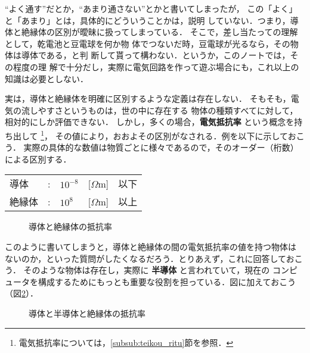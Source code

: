         “よく通す”だとか，“あまり通さない”とかと書いてしまったが，
        この「よく」と「あまり」とは，具体的にどういうことかは，説明
        していない．つまり，導体と絶縁体の区別が曖昧に扱ってしまっている．
        そこで，差し当たっての理解として，乾電池と豆電球を何か物
        体でつないだ時，豆電球が光るなら，その物体は導体である，と判
        断して貰って構わない．というか，このノートでは，その程度の理
        解で十分だし，実際に電気回路を作って遊ぶ場合にも，これ以上の
        知識は必要としない．

        実は，導体と絶縁体を明確に区別するような定義は存在しない．
        そもそも，電気の流しやすさというものは，世の中に存在する
        物体の種類すべてに対して，相対的にしか評価できない．
        しかし，多くの場合，\textbf{電気抵抗率} という概念を持ち出して
            \footnote{
                電気抵抗率については，\ref{subsub:teikou_ritu}節を参照．
            }，
        その値により，おおよその区別がなされる．例を以下に示しておこう．
        実際の具体的な数値は物質ごとに様々であるので，そのオーダー（桁数）
        による区別する．

        \begin{center}
            \begin{tabular}{lllll}
                導体    &:  & ${10}^{-8}$ & [$\Omega$m] & 以下 \\
                絶縁体  &:  & ${10}^{8}$  & [$\Omega$m] & 以上
            \end{tabular}
        \end{center}
        \begin{figure}[hbt]
            \begin{center}
                \caption{導体と絶縁体の抵抗率}
                \label{fig:DouTaiZetsuenTai_Kubetu}
            \end{center}
        \end{figure}

        このように書いてしまうと，導体と絶縁体の間の電気抵抗率の値を持つ物体は
        ないのか，といった質問がしたくなるだろう．とりあえず，これに回答しておこう．
        そのような物体は存在し，実際に \textbf{半導体} と言われていて，現在の
        コンピュータを構成するためにもっとも重要な役割を担っている．図に加えておこう
        （図\ref{fig:DouTaiHandouTaiZetsuenTai_Kubetu}）．
        \begin{figure}[hbt]
            \begin{center}
                \caption{導体と半導体と絶縁体の抵抗率}
                \label{fig:DouTaiHandouTaiZetsuenTai_Kubetu}
            \end{center}
        \end{figure}

